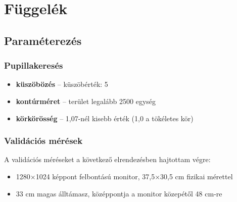 \appendix
\chapter*{Függelék}
\setcounter{chapter}{6}  %
\setcounter{equation}{0} %
\setcounter{footnote}{0}

\section{Paraméterezés}\label{sect:parameterezes}

\subsection{Pupillakeresés}

\begin{itemize}
  \item \textbf{küszöbözés} -- küszöbérték: 5
  \item \textbf{kontúrméret} -- terület legalább 2500 egység
  \item \textbf{körkörösség} -- 1,07-nél kisebb érték (1,0 a tökéletes kör)
\end{itemize}

\subsection{Validációs mérések}

A validációs méréseket a következő elrendezésben hajtottam végre:

\begin{itemize}
  \item 1280$\times$1024 képpont felbontású monitor, 37,5$\times$30,5 cm fizikai mérettel
  \item 33 cm magas álltámasz, középpontja a monitor közepétől 48 cm-re
\end{itemize}

